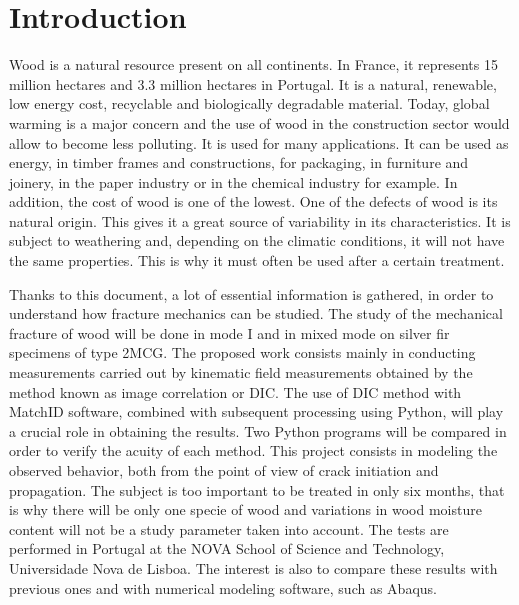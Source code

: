 
\chapter{Introduction} %

\label{Introduction} %


Wood is a natural resource present on all continents. In France, it represents 15 million hectares and 3.3 million hectares in Portugal. It is a natural, renewable, low energy cost, recyclable and biologically degradable material. Today, global warming is a major concern and the use of wood in the construction sector would allow to become less polluting. It is used for many applications. It can be used as energy, in timber frames and constructions, for packaging, in furniture and joinery, in the paper industry or in the chemical industry for example. In addition, the cost of wood is one of the lowest. One of the defects of wood is its natural origin. This gives it a great source of variability in its characteristics. It is subject to weathering and, depending on the climatic conditions, it will not have the same properties. This is why it must often be used after a certain treatment.

Thanks to this document, a lot of essential information is gathered, in order to understand how fracture mechanics can be studied. The study of the mechanical fracture of wood will be done in mode I and in mixed mode on silver fir specimens of type 2MCG. The proposed work consists mainly in conducting measurements carried out by kinematic field measurements obtained by the method known as image correlation or DIC. The use of DIC method with MatchID software, combined with subsequent processing using Python, will play a crucial role in obtaining the results. Two Python programs will be compared in order to verify the acuity of each method. This project consists in modeling the observed behavior, both from the point of view of crack initiation and propagation. The subject is too important to be treated in only six months, that is why there will be only one specie of wood and variations in wood moisture content will not be a study parameter taken into account. The tests are performed in Portugal at the NOVA School of Science and Technology, Universidade Nova de Lisboa. The interest is also to compare these results with previous ones and with numerical modeling software, such as Abaqus.

